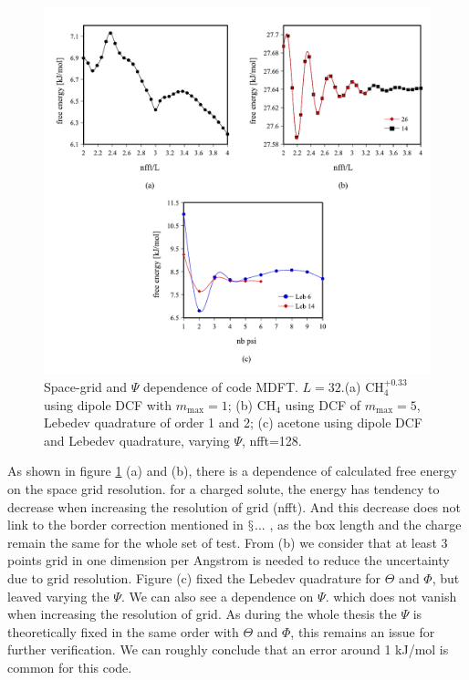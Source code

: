 \begin{figure}[H]
\begin{centering}
\includegraphics[width=0.75\columnwidth]{_figure/results/grid_reso}
\par\end{centering}
\caption[Space-grid and $\Psi$ dependence of code MDFT]{Space-grid and $\Psi$ dependence of code MDFT. $L=32$.(a) $\mathrm{CH_{4}^{+0.33}}$
using dipole DCF with $m_{\max}=1$; (b) $\mathrm{CH_{4}}$ using
DCF of $m_{\max}=5$, Lebedev quadrature of order 1 and 2; (c) acetone
using dipole DCF and Lebedev quadrature, varying $\Psi$, nfft=128.
\label{fig:Space-grid-and-psi-dependence}}
\end{figure}

As shown in figure \ref{fig:Space-grid-and-psi-dependence} (a) and
(b), there is a dependence of calculated free energy on the space
grid resolution. for a charged solute, the energy has tendency to
decrease when increasing the resolution of grid (nfft). And this decrease
does not link to the border correction mentioned in $\mathsection$...
, as the box length and the charge remain the same for the whole set
of test. From (b) we consider that at least 3 points grid in one dimension
per Angstrom is needed to reduce the uncertainty due to grid resolution.
Figure (c) fixed the Lebedev quadrature for $\Theta$ and $\Phi$,
but leaved varying the $\Psi$. We can also see a dependence on $\Psi$.
which does not vanish when increasing the resolution of grid. As during
the whole thesis the $\Psi$ is theoretically fixed in the same order
with $\Theta$ and $\Phi$, this remains an issue for further verification.
We can roughly conclude that an error around 1 kJ/mol is common for
this code.

